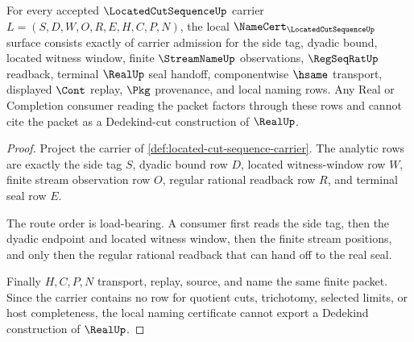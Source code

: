 \begin{theorem}
\label{thm:located-cut-sequence-namecert-obligations}
For every accepted $\LocatedCutSequenceUp$ carrier $L=(S,D,W,O,R,E,H,C,P,N)$, the local $\NameCert_{\LocatedCutSequenceUp}$ surface consists exactly of carrier admission for the side tag, dyadic bound, located witness window, finite $\StreamNameUp$ observations, $\RegSeqRatUp$ readback, terminal $\RealUp$ seal handoff, componentwise $\hsame$ transport, displayed $\Cont$ replay, $\Pkg$ provenance, and local naming rows. Any Real or Completion consumer reading the packet factors through these rows and cannot cite the packet as a Dedekind-cut construction of $\RealUp$.
\end{theorem}
\begin{proof}
Project the carrier of \autoref{def:located-cut-sequence-carrier}. The analytic rows are exactly the side tag $S$, dyadic bound row $D$, located witness-window row $W$, finite stream observation row $O$, regular rational readback row $R$, and terminal seal row $E$.

The route order is load-bearing. A consumer first reads the side tag, then the dyadic endpoint and located witness window, then the finite stream positions, and only then the regular rational readback that can hand off to the real seal.

Finally $H,C,P,N$ transport, replay, source, and name the same finite packet. Since the carrier contains no row for quotient cuts, trichotomy, selected limits, or host completeness, the local naming certificate cannot export a Dedekind construction of $\RealUp$.
\end{proof}


\begin{closurestatus}{\LocatedCutSequenceUp}
  \theoryclosure{\seedClosure}
  \formalstatus{\unformalizedV}
\end{closurestatus}
